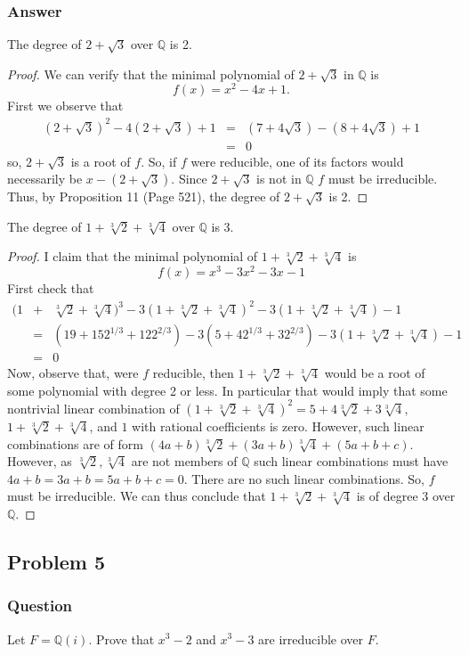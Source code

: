 \documentclass[10pt]{article}
\begin{document}
\subsubsection{Answer}
The degree of $2+\sqrt3$ over $\mathbb{Q}$ is 2. 
\begin{proof}
We can verify that the minimal polynomial of $2+\sqrt3$ in $\mathbb{Q}$ is 
\[f(x)=x^2-4x+1.\]
First we observe that
\begin{eqnarray*}(2+\sqrt3)^2-4(2+\sqrt3)+1&=& (7+4\sqrt3) -(8+4\sqrt3)+1 \\ &=& 0\end{eqnarray*}
so, $2+\sqrt3$ is a root of $f$. So, if $f$ were reducible, one of its factors would necessarily be $x-(2+\sqrt3)$. Since $2+\sqrt3$ is not in $\mathbb{Q}$ $f$ must be irreducible. Thus, by Proposition 11 (Page 521), the degree of $2+\sqrt3$ is 2.
\end{proof}
The degree of $1+\sqrt[3]{2}+\sqrt[3]{4}$ over $\mathbb{Q}$ is 3. 
\begin{proof}I claim that the minimal polynomial of $1+\sqrt[3]{2}+\sqrt[3]{4}$ is
\[f(x)=x^3-3x^2-3x-1\]
First check that
\begin{eqnarray*}(1&+&\sqrt[3]{2}+\sqrt[3]{4})^3-3(1+\sqrt[3]{2}+\sqrt[3]{4})^2-3(1+\sqrt[3]{2}+\sqrt[3]{4})-1\\ &=&(19+15 2^{1/3}+12 2^{2/3}) -3(5+4 2^{1/3}+3 2^{2/3})-3(1+\sqrt[3]{2}+\sqrt[3]{4})-1\\ &=&0\end{eqnarray*}
Now, observe that, were $f$ reducible, then $1+\sqrt[3]{2}+\sqrt[3]{4}$ would be a root of some polynomial with degree 2 or less. In particular that would imply that some nontrivial linear combination of $(1+\sqrt[3]{2}+\sqrt[3]{4})^2= 5+4 \sqrt[3]2+3 \sqrt[3]4$, $1+\sqrt[3]{2}+\sqrt[3]{4}$, and $1$ with rational coefficients is zero. However, such linear combinations are of form $(4a+b)\sqrt[3]2+(3a+b)\sqrt[3]4+(5a+b+c)$. However, as $\sqrt[3]2, \sqrt[3]4$ are not members of $\mathbb{Q}$ such linear combinations must have $4a+b=3a+b=5a+b+c=0$. There are no such linear combinations. So, $f$ must be irreducible. We can thus conclude that $1+\sqrt[3]{2}+\sqrt[3]{4}$ is of degree 3 over $\mathbb{Q}$.
\end{proof}
\subsection{Problem 5}
\subsubsection{Question}
Let $F=\mathbb{Q}(i)$. Prove that $x^3-2$ and $x^3-3$ are irreducible over $F$.
\end{document}

